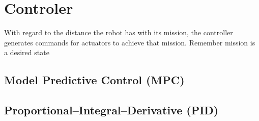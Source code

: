 \chapter{Controler}

With regard to the distance the robot has with its mission, the controller generates commands for actuators to achieve that mission. Remember mission is a desired state
\section{Model Predictive Control (MPC)}
\section{Proportional–Integral–Derivative (PID)}